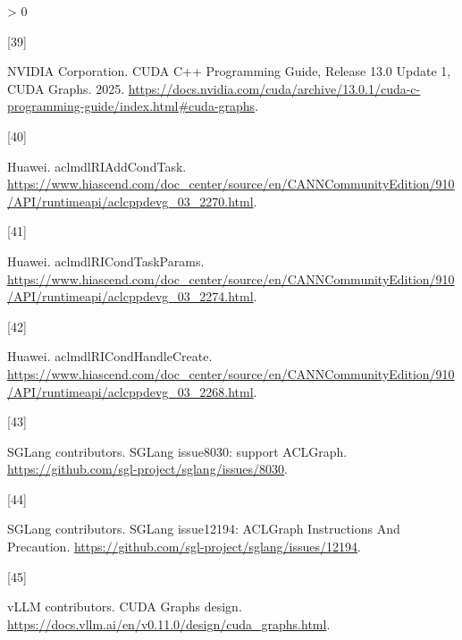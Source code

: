 \documentclass[
  UTF8,
  zihao=5]{ctexart}
\newlength{\cslhangindent}
\newlength{\csllabelwidth}
\newenvironment{CSLReferences}[2] %
 {%
  \setlength{\parindent}{0pt}
  \ifodd #1 \everypar{\setlength{\hangindent}{\cslhangindent}}\ignorespaces\fi
  \ifnum #2 > 0
  \setlength{\parskip}{#2\baselineskip}
  \fi
 }%
 {}
\newcommand{\CSLLeftMargin}[1]{\parbox[t]{\csllabelwidth}{#1}}
\newcommand{\CSLRightInline}[1]{\parbox[t]{\linewidth - \csllabelwidth}{#1}\par}
\begin{document}
\begin{CSLReferences}{0}{0}
\leavevmode{}%
\CSLLeftMargin{{[}39{]} }%
\CSLRightInline{NVIDIA Corporation. CUDA C++ Programming Guide, Release
13.0 Update 1, CUDA Graphs. 2025.
\url{https://docs.nvidia.com/cuda/archive/13.0.1/cuda-c-programming-guide/index.html\#cuda-graphs}.}

\leavevmode{}%
\CSLLeftMargin{{[}40{]} }%
\CSLRightInline{Huawei. {aclmdlRIAddCondTask}.
\url{https://www.hiascend.com/doc_center/source/en/CANNCommunityEdition/910/API/runtimeapi/aclcppdevg_03_2270.html}.}

\leavevmode{}%
\CSLLeftMargin{{[}41{]} }%
\CSLRightInline{Huawei. {aclmdlRICondTaskParams}.
\url{https://www.hiascend.com/doc_center/source/en/CANNCommunityEdition/910/API/runtimeapi/aclcppdevg_03_2274.html}.}

\leavevmode{}%
\CSLLeftMargin{{[}42{]} }%
\CSLRightInline{Huawei. {aclmdlRICondHandleCreate}.
\url{https://www.hiascend.com/doc_center/source/en/CANNCommunityEdition/910/API/runtimeapi/aclcppdevg_03_2268.html}.}

\leavevmode{}%
\CSLLeftMargin{{[}43{]} }%
\CSLRightInline{SGLang contributors. {SGLang issue8030: support
ACLGraph}. \url{https://github.com/sgl-project/sglang/issues/8030}.}

\leavevmode{}%
\CSLLeftMargin{{[}44{]} }%
\CSLRightInline{SGLang contributors. {SGLang issue12194: ACLGraph
Instructions And Precaution}.
\url{https://github.com/sgl-project/sglang/issues/12194}.}

\leavevmode{}%
\CSLLeftMargin{{[}45{]} }%
\CSLRightInline{vLLM contributors. {CUDA Graphs design}.
\url{https://docs.vllm.ai/en/v0.11.0/design/cuda_graphs.html}.}

\end{CSLReferences}
\end{document}
